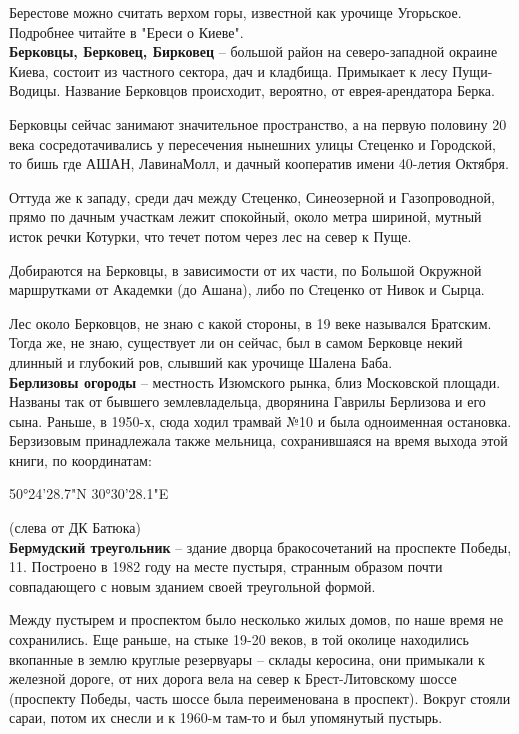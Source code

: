 Берестове можно считать верхом горы, известной как урочище Угорьское. Подробнее читайте в "Ереси о Киеве".\\



\textbf{Берковцы, Берковец, Бирковец} – большой район на северо-западной окраине Киева, состоит из частного сектора, дач и кладбища. Примыкает к лесу Пущи-Водицы. Название Берковцов происходит, вероятно, от еврея-арендатора Берка.

Берковцы сейчас занимают значительное пространство, а на первую половину 20 века сосредотачивались у пересечения нынешних улицы Стеценко и Городской, то бишь где АШАН, ЛавинаМолл, и дачный кооператив имени 40-летия Октября. 

Оттуда же к западу, среди дач между Стеценко, Синеозерной и Газопроводной, прямо по дачным участкам лежит спокойный, около метра шириной, мутный исток речки Котурки, что течет потом через лес на север к Пуще.

Добираются на Берковцы, в зависимости от их части, по Большой Окружной маршрутками от Академки (до Ашана), либо по Стеценко от Нивок и Сырца.

Лес около Берковцов, не знаю с какой стороны, в 19 веке назывался Братским. Тогда же, не знаю, существует ли он сейчас, был в самом Берковце некий длинный и глубокий ров, слывший как урочище Шалена Баба.\\

\textbf{Берлизовы огороды} – местность Изюмского рынка, близ Московской площади. Названы так от бывшего землевладельца, дворянина Гаврилы Берлизова и его сына. Раньше, в 1950-х, сюда ходил трамвай №10 и была одноименная остановка. Берзизовым принадлежала также мельница, сохранившаяся на время выхода этой книги, по координатам:

50°24'28.7"N 30°30'28.1"E

(слева от ДК Батюка)
\\

\textbf{Бермудский треугольник} – здание дворца бракосочетаний на проспекте Победы, 11. Построено в 1982 году на месте пустыря, странным образом почти совпадающего с новым зданием своей треугольной формой.

Между пустырем и проспектом было несколько жилых домов, по наше время не сохранились. Еще раньше, на стыке 19-20 веков, в той околице находились вкопанные в землю круглые резервуары – склады керосина, они примыкали к железной дороге, от них дорога вела на север к Брест-Литовскому шоссе (проспекту Победы, часть шоссе была переименована в проспект). Вокруг стояли сараи, потом их снесли и к 1960-м там-то и был упомянутый пустырь.\\

